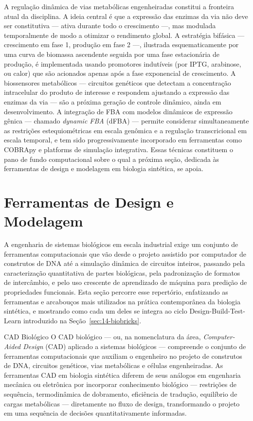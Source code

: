 A regulação dinâmica de vias metabólicas engenheiradas constitui a fronteira atual da disciplina. A ideia central é que a expressão das enzimas da via não deve ser constitutiva --- ativa durante todo o crescimento ---, mas modulada temporalmente de modo a otimizar o rendimento global. A estratégia bifásica --- crescimento em fase 1, produção em fase 2 ---, ilustrada esquematicamente por uma curva de biomassa ascendente seguida por uma fase estacionária de produção, é implementada usando promotores indutíveis (por IPTG, arabinose, ou calor) que são acionados apenas após a fase exponencial de crescimento. A biossensores metabólicos --- circuitos genéticos que detectam a concentração intracelular do produto de interesse e respondem ajustando a expressão das enzimas da via --- são a próxima geração de controle dinâmico, ainda em desenvolvimento. A integração de FBA com modelos dinâmicos de expressão gênica --- chamado \emph{dynamic FBA} (dFBA) --- permite considerar simultaneamente as restrições estequiométricas em escala genômica e a regulação transcricional em escala temporal, e tem sido progressivamente incorporado em ferramentas como COBRApy e platforms de simulação integrativa. Essas técnicas constituem o pano de fundo computacional sobre o qual a próxima seção, dedicada às ferramentas de design e modelagem em biologia sintética, se apoia.



\section{Ferramentas de Design e Modelagem}
\label{sec:14-ferramentas}

A engenharia de sistemas biológicos em escala industrial exige um conjunto de ferramentas computacionais que vão desde o projeto assistido por computador de construtos de DNA até a simulação dinâmica de circuitos inteiros, passando pela caracterização quantitativa de partes biológicas, pela padronização de formatos de intercâmbio, e pelo uso crescente de aprendizado de máquina para predição de propriedades funcionais. Esta seção percorre esse repertório, enfatizando as ferramentas e arcabouços mais utilizados na prática contemporânea da biologia sintética, e mostrando como cada um deles se integra ao ciclo Design-Build-Test-Learn introduzido na Seção~\ref{sec:14-biobricks}.

\begin{definicao}{CAD Biológico}
O CAD biológico --- ou, na nomenclatura da área, \emph{Computer-Aided Design} (CAD) aplicado a sistemas biológicos --- compreende o conjunto de ferramentas computacionais que auxiliam o engenheiro no projeto de construtos de DNA, circuitos genéticos, vias metabólicas e células engenheiradas. As ferramentas CAD em biologia sintética diferem de seus análogos em engenharia mecânica ou eletrônica por incorporar conhecimento biológico --- restrições de sequência, termodinâmica de dobramento, eficiência de tradução, equilíbrio de cargas metabólicas --- diretamente no fluxo de design, transformando o projeto em uma sequência de decisões quantitativamente informadas.
\end{definicao}

